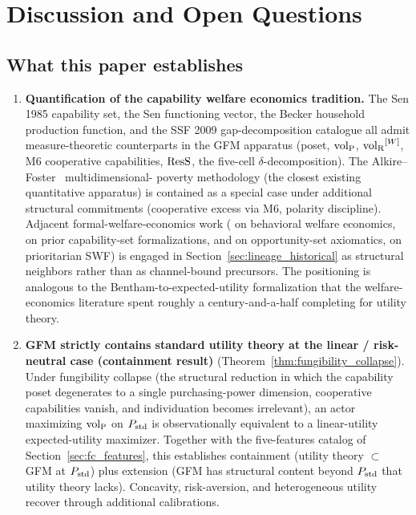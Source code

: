 \section{Discussion and Open Questions}
\label{sec:discussion}

\subsection{What this paper establishes}
\label{sec:established}

\begin{enumerate}
\item \textbf{Quantification of the capability welfare economics
  tradition.}  The Sen 1985 capability set, the
  Sen functioning vector, the Becker household production
  function, and the SSF 2009 gap-decomposition catalogue all
  admit measure-theoretic counterparts in the GFM apparatus
  (poset, ${\operatorname{vol}_{\mathrm{P}}}$, ${\operatorname{vol}_{\mathrm{R}}}^{[W]}$, M6 cooperative capabilities,
  $\mathrm{ResS}$, the five-cell $\delta$-decomposition).  The
  Alkire--Foster~\citep{alkire2011counting} multidimensional-
  poverty methodology (the closest existing quantitative
  apparatus) is contained as a special case under additional
  structural commitments (cooperative excess via M6, polarity
  discipline).  Adjacent formal-welfare-economics work
  (\citet{bernheim2009beyond} on behavioral welfare economics,
  \citet{basu2011functionings} on prior capability-set
  formalizations, \citet{sugden2003opportunity} and
  \citet{pattanaik2000ranking} on opportunity-set axiomatics,
  \citet{adler2012wellbeing} on prioritarian SWF) is engaged in
  Section~\ref{sec:lineage_historical} as structural neighbors
  rather than as channel-bound precursors.  The positioning is analogous to the
  Bentham-to-expected-utility formalization that the
  welfare-economics literature spent roughly a
  century-and-a-half completing for utility theory.

\item \textbf{GFM strictly contains standard utility theory at the
  linear / risk-neutral case (containment result)}
  (Theorem~\ref{thm:fungibility_collapse}).  Under fungibility
  collapse (the structural reduction in which the capability
  poset degenerates to a single purchasing-power dimension,
  cooperative capabilities vanish, and individuation becomes
  irrelevant), an actor maximizing ${\operatorname{vol}_{\mathrm{P}}}$ on $P_{\mathrm{std}}$ is
  observationally equivalent to a linear-utility expected-utility
  maximizer.  Together with the five-features catalog of
  Section~\ref{sec:fc_features}, this establishes containment
  (utility theory $\subset$ GFM at $P_{\mathrm{std}}$) plus extension (GFM
  has structural content beyond $P_{\mathrm{std}}$ that utility theory
  lacks).  Concavity, risk-aversion, and heterogeneous utility
  recover through additional calibrations.


\end{enumerate}
